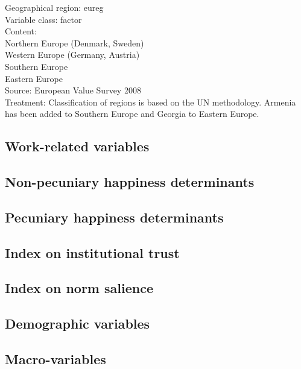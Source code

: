 \documentclass[preprint,12pt,authoryear]{elsarticle}
\begin{document}
 	Geographical region: eureg \\ \noindent\hspace*{10mm}%
 	Variable class: factor \\ \noindent\hspace*{10mm}%
 	Content: \\ 
 		\noindent\hspace*{20mm}%
 		Northern Europe (Denmark, Sweden)\\ \noindent\hspace*{20mm}%
 		Western Europe (Germany, Austria)\\ \noindent\hspace*{20mm}%
 		Southern Europe\\ \noindent\hspace*{20mm}%
 		Eastern Europe\\
 		
 	\noindent\hspace*{10mm}%
 	Source: European Value Survey 2008\\ \noindent\hspace*{10mm}%
 	Treatment: Classification of regions is based on the UN methodology. Armenia has been added to Southern Europe and Georgia to Eastern Europe.\\
 	

\subsection{Work-related variables}
\subsection{Non-pecuniary happiness determinants}
\subsection{Pecuniary happiness determinants}
\subsection{Index on institutional trust}
\subsection{Index on norm salience}
\subsection{Demographic variables}
\subsection{Macro-variables}
\end{document}

